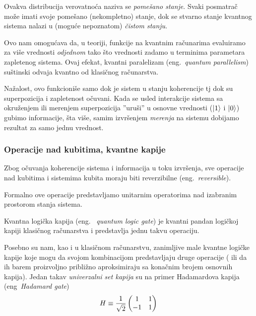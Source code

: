 \documentclass[a4paper]{article}
\begin{document}
{Ovakva distribucija verovatnoća naziva se \textit{pomešano stanje}\cite{qfc}. Svaki posmatrač može imati svoje pomešano (nekompletno) stanje, dok se stvarno stanje kvantnog sistema nalazi u (moguće nepoznatom) \textit{čistom stanju}.

Ovo nam omogućava da, u teoriji, funkcije na kvantnim računarima evaluiramo za više vrednosti \emph{odjednom} tako što vrednosti zadamo u terminima parametara zapletenog sistema. Ovaj efekat, kvantni paralelizam (eng.~\emph{quantum parallelism}) \cite[Ch. 1.4.2]{knjiga} suštinski odvaja kvantno od klasičnog računarstva.

Nažalost, ovo funkcioniše samo dok je sistem u stanju koherencije  tj dok su superpozicija i zapletenost očuvani. Kada se usled interakcije sistema sa okruženjem ili merenjem superpozicija ''uruši'' u osnovne vrednosti ($\ket{1}$ i $\ket{0}$) gubimo informacije, šta više, samim izvršenjem \emph{merenja} na sistemu dobijamo rezultat za samo jednu vrednost.\cite[Ch. 1.4.2]{knjiga}

\subsubsection {Operacije nad kubitima, kvantne kapije}

Zbog očuvanja koherencije sistema i informacija u toku izvršenja, sve operacije nad kubitima i sistemima kubita moraju biti reverzibilne (eng.~\emph{reversible}).

Formalno ove operacije predstavljamo unitarnim operatorima nad izabranim prostorom stanja sistema.

Kvantna logička kapija (eng. ~\emph{quantum logic gate}) je kvantni pandan logičkoj kapiji klasičnog računarstva i predstavlja jednu takvu operaciju.

Posebno su nam, kao i u klasičnom računarstvu, zanimljive male kvantne logičke kapije koje mogu da svojom kombinacijom predstavljaju druge operacije ( ili da ih barem proizvoljno približno aproksimiraju sa konačnim brojem osnovnih kapija). Jedan takav \emph{univerzalni set kapija} su na primer Hadamardova kapija (eng~\emph{Hadamard gate})\\
\smallskip
\begin{equation*}
H\equiv\frac{1}{\sqrt{2}}\begin{pmatrix}
1&1\\
-1&1
\end{pmatrix}\\
\end{equation*}

}
\end{document}
